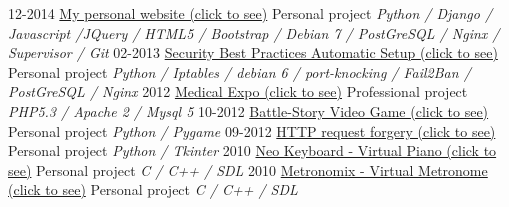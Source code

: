 \documentclass[]{friggeri-cv}
\begin{document}
\begin{entrylist}
  \entry
    {12-2014}
    {\href{http:www.herve-beraud.ovh}{My personal website (click to see)}}
    {Personal project}
    {\emph{Python / Django / Javascript /JQuery / HTML5 / Bootstrap / Debian 7 / PostGreSQL / Nginx / Supervisor / Git}}
  \entry
    {02-2013}
    {\href{https://github.com/4383/fabric-debian/}{Security Best Practices Automatic Setup (click to see)}}
    {Personal project}
    {\emph{Python / Iptables /  debian 6 / port-knocking / Fail2Ban / PostGreSQL / Nginx}}
  \entry
    {2012}
    {\href{http://medical-expo.com}{Medical Expo (click to see)}}
    {Professional project}
    {\emph{PHP5.3 / Apache 2 / Mysql 5}}
  \entry
    {10-2012}
    {\href{http://github.com/4383/battle-story/}{Battle-Story Video Game (click to see)}}
    {Personal project}
    {\emph{Python / Pygame}}
  \entry
    {09-2012}
    {\href{http://github.com/4383/WebForge/}{HTTP request forgery (click to see)}}
    {Personal project}
    {\emph{Python / Tkinter}}
  \entry
    {2010}
    {\href{http://fr.wikipedia.org/wiki/Neo\_Keyboard}{Neo Keyboard - Virtual Piano (click to see)}}
    {Personal project}
    {\emph{C / C++ / SDL}}
  \entry
    {2010}
    {\href{http://fr.wikipedia.org/wiki/Metronomix}{Metronomix - Virtual Metronome (click to see)}}
    {Personal project}
    {\emph{C / C++ / SDL}}
\end{entrylist}
\end{document}
